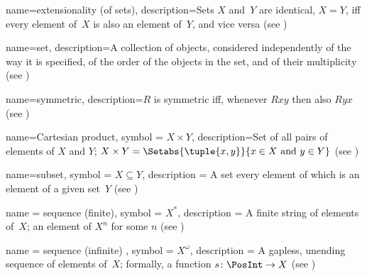 
 {
  name={extensionality (of sets)},  
  description={Sets $X$ and~$Y$ are identical, $X = Y$, iff every
    element of~$X$ is also an element of~$Y$, and vice versa
    (see )}}


 {
  name=set,  
  description={A collection of objects, considered independently of
    the way it is specified, of the order of the objects in the set,
    and of their multiplicity (see )} }

 {
  name=symmetric,  
  description={$R$ is symmetric iff, whenever $Rxy$ then also $Ryx$
    (see )} }

 {
  name=Cartesian product,
  symbol = {\ensuremath{X \times Y}},  
  description={Set of all pairs of {elements} of $X$ and $Y$; $X
    \times Y = \Setabs{\tuple{x, y}}{x \in X \text{ and } y \in Y}$
    (see )} }

 {
  name=subset,
  symbol = {\ensuremath{X \subseteq Y}},
  description = {A set every {element} of which is an {element} of
    a given set~$Y$ (see )}  }

 {
  name = {sequence (finite)},
  symbol = {\ensuremath{X^*}},
  description = {A finite string of {element}s of~$X$; an
    {element} of $X^n$ for some $n$ (see
    )}}

 {
  name = {sequence (infinite) },
  symbol = {\ensuremath{X^\omega}},
  description = {A gapless, unending sequence of {element}s of~$X$;
    formally, a function $s\colon \PosInt \to X$ (see
    )}}

